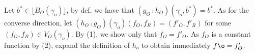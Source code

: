 \documentclass[12pt,a4paper]{article}
\renewcommand{\O}{_{O}}\alwaysmath{O}
\newcommand{\R}{\ensuremath{_{R}}}
\begin{document}
Let $b^* \in \lfloor B\O(\gamma_o) \rfloor$, by def. we have that $ (g\O \comp h\O)(\gamma_o, b^*) = b^*$. As for the converse direction, let $(h\O \comp  g\O)(\gamma_o)(f\O, f\R)=(f'\O, f'\R)$ for some $(f\O, f\R) \in V\O(\gamma_o)$. By (1), we show only that $f\O = f'\O$. As $f\O$ is a constant function by (2), expand the definition of $h_o$ to obtain immediately $f\o = f'\O$.

\newpage
%

\begin{center}

\end{center}

\printbibliography
\end{document}
